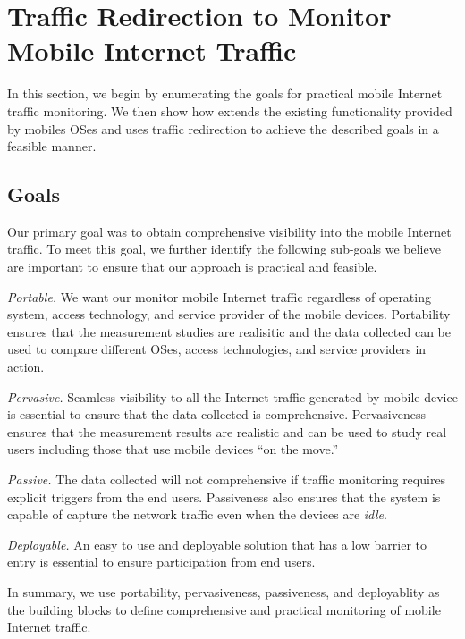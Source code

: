 \section{Traffic Redirection to Monitor Mobile Internet Traffic} 
\label{sec:platform} 

In this section, we begin by enumerating the goals for practical mobile Internet traffic monitoring.
We then show how \platname extends the existing functionality provided by mobiles OSes and uses traffic redirection to achieve the described goals in a feasible manner. 

\subsection{Goals}  
\label{sec:goals} 
Our primary goal was to obtain comprehensive visibility into the mobile Internet traffic. 
To meet this goal, we further identify the following sub-goals we believe are important to ensure that our approach is practical and feasible. 
\begin{packedenumerate}
\item \emph{Portable.} We want our monitor mobile Internet traffic regardless of operating system, access technology, and service provider of the mobile devices.
Portability ensures that the measurement studies are realisitic and the data collected can be used to compare different OSes, access technologies, and service providers in action.
\item \emph{Pervasive.} Seamless visibility to all the Internet traffic generated by mobile device is essential to ensure that the data collected is comprehensive.
Pervasiveness ensures that the measurement results are realistic and can be used to study real users including those that use mobile devices ``on the move.''
\item \emph{Passive.} The data collected will not comprehensive if traffic monitoring requires explicit triggers from the end users. 
Passiveness also ensures that the system is capable of capture the network traffic even when the devices are \emph{idle}.  
\item \emph{Deployable.} An easy to use and deployable solution that has a low barrier to entry is essential to ensure participation from end users.
\end{packedenumerate}    
In summary, we use portability, pervasiveness, passiveness, and deployablity as the building blocks to define comprehensive and practical monitoring of mobile Internet traffic.  

